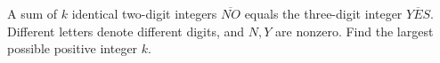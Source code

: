 A sum of $k$ identical two-digit integers $\overline{NO}$ equals the three-digit integer $\overline{YES}$. Different letters denote different digits, and $N,Y$ are nonzero. Find the largest possible positive integer $k$.
